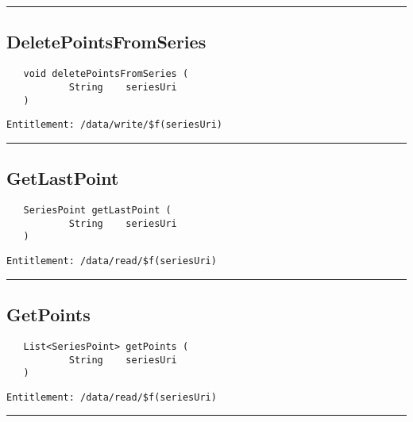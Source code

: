 \rule{12cm}{2pt}
\subsection{DeletePointsFromSeries}
\label{Api:DeletePointsFromSeries}
\begin{Verbatim}
   void deletePointsFromSeries (
           String    seriesUri
   )
\end{Verbatim}
\begin{Verbatim}[formatcom=\color{Maroon}]
  Entitlement: /data/write/$f(seriesUri)
\end{Verbatim}



\rule{12cm}{2pt}
\subsection{GetLastPoint}
\label{Api:GetLastPoint}
\begin{Verbatim}
   SeriesPoint getLastPoint (
           String    seriesUri
   )
\end{Verbatim}
\begin{Verbatim}[formatcom=\color{Maroon}]
  Entitlement: /data/read/$f(seriesUri)
\end{Verbatim}



\rule{12cm}{2pt}
\subsection{GetPoints}
\label{Api:GetPoints}
\begin{Verbatim}
   List<SeriesPoint> getPoints (
           String    seriesUri
   )
\end{Verbatim}
\begin{Verbatim}[formatcom=\color{Maroon}]
  Entitlement: /data/read/$f(seriesUri)
\end{Verbatim}



\rule{12cm}{2pt}
